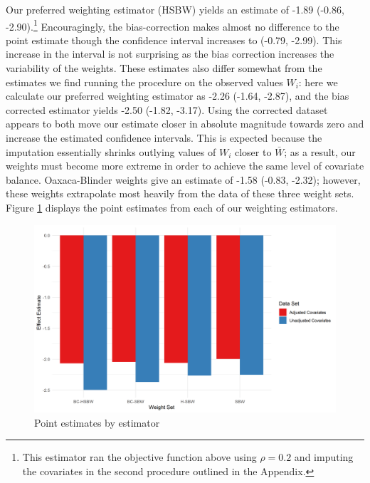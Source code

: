 \documentclass[12pt]{article}
\begin{document}
Our preferred weighting estimator (HSBW) yields an estimate of -1.89 (-0.86, -2.90).\footnote{This estimator ran the objective function above using $\rho = 0.2$ and imputing the covariates in the second procedure outlined in the Appendix.} Encouragingly, the bias-correction makes almost no difference to the point estimate though the confidence interval increases to (-0.79, -2.99). This increase in the interval is not surprising as the bias correction increases the variability of the weights. These estimates also differ somewhat from the estimates we find running the procedure on the observed values $W_i$: here we calculate our preferred weighting estimator as -2.26 (-1.64, -2.87), and the bias corrected estimator yields -2.50 (-1.82, -3.17). Using the corrected dataset appears to both move our estimate closer in absolute magnitude towards zero and increase the estimated confidence intervals. This is expected because the imputation essentially shrinks outlying values of $W_i$ closer to $\bar{W}$; as a result, our weights must become more extreme in order to achieve the same level of covariate balance. Oaxaca-Blinder weights give an estimate of -1.58 (-0.83, -2.32); however, these weights extrapolate most heavily from the data of these three weight sets. Figure \ref{estimators} displays the point estimates from each of our weighting estimators. 

\begin{figure}[B]
\begin{center}
    \includegraphics[scale=0.6]{01_Plots/point-estimates-c1.png}
    \caption{Point estimates by estimator}
    \label{estimators}
\end{center}
\end{figure}
\end{document}
